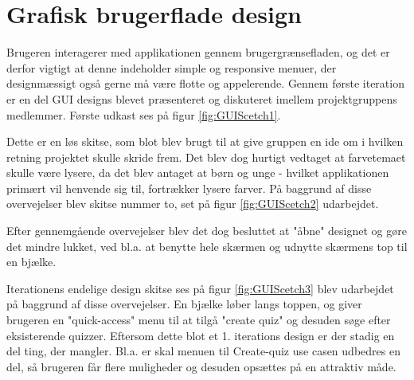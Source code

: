 \section{Grafisk brugerflade design}
Brugeren interagerer med applikationen gennem brugergrænsefladen, og det er derfor vigtigt at denne indeholder simple og responsive menuer, der designmæssigt også gerne må være flotte og appelerende.  
Gennem første iteration er en del GUI designs blevet præsenteret og diskuteret imellem projektgruppens medlemmer. Første udkast ses på figur \ref{fig:GUIScetch1}.


Dette er en løs skitse, som blot blev brugt til at give gruppen en ide om i hvilken retning projektet skulle skride frem. Det blev dog hurtigt vedtaget at farvetemaet skulle være lysere, da det blev antaget at børn og unge - hvilket applikationen primært vil henvende sig til, fortrækker lysere farver.
På baggrund af disse overvejelser blev skitse nummer to, set på figur \ref{fig:GUIScetch2} udarbejdet.


Efter gennemgående overvejelser blev det dog besluttet at "åbne" designet og gøre det mindre lukket, ved bl.a. at benytte hele skærmen og udnytte skærmens top til en bjælke.


Iterationens endelige design skitse ses på figur \ref{fig:GUIScetch3} blev udarbejdet på baggrund af disse overvejelser. En bjælke løber langs toppen, og giver brugeren en "quick-access" menu til at tilgå "create quiz" og desuden søge efter eksisterende quizzer. 
Eftersom dette blot et 1. iterations design er der stadig en del ting, der mangler. Bl.a. er skal menuen til Create-quiz use casen udbedres en del, så brugeren får flere muligheder og desuden opsættes på en attraktiv måde. 
